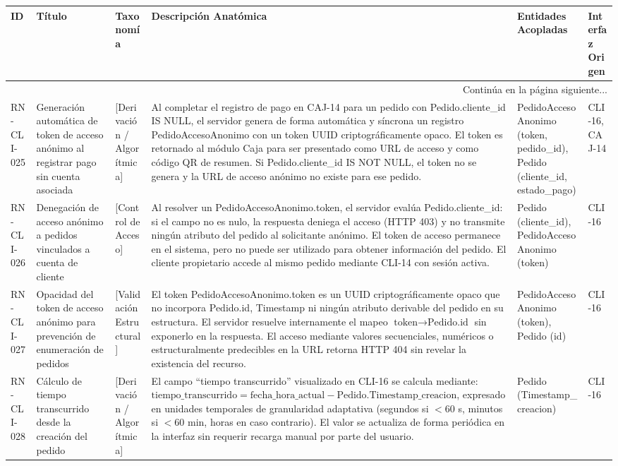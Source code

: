\begin{landscape}
\begin{longtable}[c]{l p{2.1cm} p{2.1cm} p{8cm} p{4cm} p{3cm}}
\toprule
\textbf{ID} & \textbf{Título} & \textbf{Taxonomía} & \textbf{Descripción Anatómica} & \textbf{Entidades Acopladas} & \textbf{Interfaz Origen} \\
\midrule
\endhead

\midrule
\multicolumn{6}{r}{\small Continúa en la página siguiente...} \\
\endfoot
\bottomrule
\endlastfoot

RN-CLI-025 & Generación automática de token de acceso anónimo al registrar pago sin cuenta asociada & [Derivación / Algorítmica] & Al completar el registro de pago en CAJ-14 para un pedido con Pedido.cliente\_id IS NULL, el servidor genera de forma automática y síncrona un registro PedidoAccesoAnonimo con un token UUID criptográficamente opaco. El token es retornado al módulo Caja para ser presentado como URL de acceso y como código QR de resumen. Si Pedido.cliente\_id IS NOT NULL, el token no se genera y la URL de acceso anónimo no existe para ese pedido. & PedidoAccesoAnonimo (token, pedido\_id), Pedido (cliente\_id, estado\_pago) & CLI-16, CAJ-14 \\
\addlinespace
RN-CLI-026 & Denegación de acceso anónimo a pedidos vinculados a cuenta de cliente & [Control de Acceso] & Al resolver un PedidoAccesoAnonimo.token, el servidor evalúa Pedido.cliente\_id: si el campo no es nulo, la respuesta deniega el acceso (HTTP 403) y no transmite ningún atributo del pedido al solicitante anónimo. El token de acceso permanece en el sistema, pero no puede ser utilizado para obtener información del pedido. El cliente propietario accede al mismo pedido mediante CLI-14 con sesión activa. & Pedido (cliente\_id), PedidoAccesoAnonimo (token) & CLI-16 \\
\addlinespace
RN-CLI-027 & Opacidad del token de acceso anónimo para prevención de enumeración de pedidos & [Validación Estructural] & El token PedidoAccesoAnonimo.token es un UUID criptográficamente opaco que no incorpora Pedido.id, Timestamp ni ningún atributo derivable del pedido en su estructura. El servidor resuelve internamente el mapeo $\text{token} \rightarrow \text{Pedido.id}$ sin exponerlo en la respuesta. El acceso mediante valores secuenciales, numéricos o estructuralmente predecibles en la URL retorna HTTP 404 sin revelar la existencia del recurso. & PedidoAccesoAnonimo (token), Pedido (id) & CLI-16 \\
\addlinespace
RN-CLI-028 & Cálculo de tiempo transcurrido desde la creación del pedido & [Derivación / Algorítmica] & El campo ``tiempo transcurrido'' visualizado en CLI-16 se calcula mediante: $\text{tiempo\_transcurrido} = \text{fecha\_hora\_actual} - \text{Pedido.Timestamp\_creacion}$, expresado en unidades temporales de granularidad adaptativa (segundos si $< 60$ s, minutos si $< 60$ min, horas en caso contrario). El valor se actualiza de forma periódica en la interfaz sin requerir recarga manual por parte del usuario. & Pedido (Timestamp\_creacion) & CLI-16 \\

\end{longtable}
\end{landscape}
